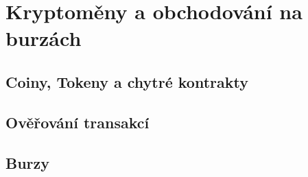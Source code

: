 \chapter{Kryptoměny a obchodování na burzách}
\label{sec:CryptoAndTrading}

\section{Coiny, Tokeny a chytré kontrakty}
\label{sec:CoinsTokensSmartContracts}

\section{Ověřování transakcí}
\label{sec:BlockchainSecurity}

\section{Burzy}
\label{sec:Exchanges}

\endinput
